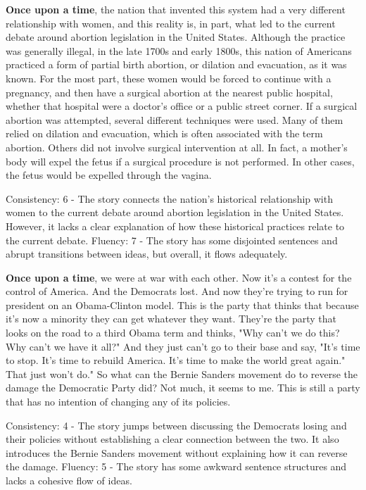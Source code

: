 \documentclass{article}
\begin{document}
\textbf{Once upon a time}, the nation that invented this system had a very different relationship with women, and this reality is, in part, what led to the current debate around abortion legislation in the United States. Although the practice was generally illegal, in the late 1700s and early 1800s, this nation of Americans practiced a form of partial birth abortion, or dilation and evacuation, as it was known. For the most part, these women would be forced to continue with a pregnancy, and then have a surgical abortion at the nearest public hospital, whether that hospital were a doctor's office or a public street corner. If a surgical abortion was attempted, several different techniques were used. Many of them relied on dilation and evacuation, which is often associated with the term abortion. Others did not involve surgical intervention at all. In fact, a mother's body will expel the fetus if a surgical procedure is not performed. In other cases, the fetus would be expelled through the vagina.

Consistency: 6 - The story connects the nation's historical relationship with women to the current debate around abortion legislation in the United States. However, it lacks a clear explanation of how these historical practices relate to the current debate.
Fluency: 7 - The story has some disjointed sentences and abrupt transitions between ideas, but overall, it flows adequately.

\textbf{Once upon a time}, we were at war with each other. Now it's a contest for the control of America. And the Democrats lost. And now they're trying to run for president on an Obama-Clinton model. This is the party that thinks that because it's now a minority they can get whatever they want. They're the party that looks on the road to a third Obama term and thinks, "Why can't we do this? Why can't we have it all?" And they just can't go to their base and say, "It's time to stop. It's time to rebuild America. It's time to make the world great again." That just won't do." So what can the Bernie Sanders movement do to reverse the damage the Democratic Party did? Not much, it seems to me. This is still a party that has no intention of changing any of its policies.

Consistency: 4 - The story jumps between discussing the Democrats losing and their policies without establishing a clear connection between the two. It also introduces the Bernie Sanders movement without explaining how it can reverse the damage.
Fluency: 5 - The story has some awkward sentence structures and lacks a cohesive flow of ideas.
\end{document}
